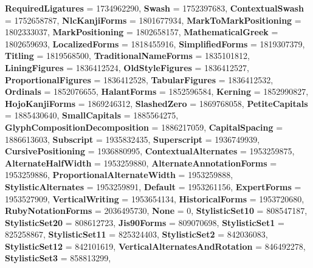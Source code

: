 \begin{DoxyCompactItemize}
{\bfseries Required\+Ligatures} = 1734962290, 
{\bfseries Swash} = 1752397683, 
{\bfseries Contextual\+Swash} = 1752658787, 
\newline
{\bfseries Nlc\+Kanji\+Forms} = 1801677934, 
{\bfseries Mark\+To\+Mark\+Positioning} = 1802333037, 
{\bfseries Mark\+Positioning} = 1802658157, 
{\bfseries Mathematical\+Greek} = 1802659693, 
\newline
{\bfseries Localized\+Forms} = 1818455916, 
{\bfseries Simplified\+Forms} = 1819307379, 
{\bfseries Titling} = 1819568500, 
{\bfseries Traditional\+Name\+Forms} = 1835101812, 
\newline
{\bfseries Lining\+Figures} = 1836412524, 
{\bfseries Old\+Style\+Figures} = 1836412527, 
{\bfseries Proportional\+Figures} = 1836412528, 
{\bfseries Tabular\+Figures} = 1836412532, 
\newline
{\bfseries Ordinals} = 1852076655, 
{\bfseries Halant\+Forms} = 1852596584, 
{\bfseries Kerning} = 1852990827, 
{\bfseries Hojo\+Kanji\+Forms} = 1869246312, 
\newline
{\bfseries Slashed\+Zero} = 1869768058, 
{\bfseries Petite\+Capitals} = 1885430640, 
{\bfseries Small\+Capitals} = 1885564275, 
{\bfseries Glyph\+Composition\+Decomposition} = 1886217059, 
\newline
{\bfseries Capital\+Spacing} = 1886613603, 
{\bfseries Subscript} = 1935832435, 
{\bfseries Superscript} = 1936749939, 
{\bfseries Cursive\+Positioning} = 1936880995, 
\newline
{\bfseries Contextual\+Alternates} = 1953259875, 
{\bfseries Alternate\+Half\+Width} = 1953259880, 
{\bfseries Alternate\+Annotation\+Forms} = 1953259886, 
{\bfseries Proportional\+Alternate\+Width} = 1953259888, 
\newline
{\bfseries Stylistic\+Alternates} = 1953259891, 
{\bfseries Default} = 1953261156, 
{\bfseries Expert\+Forms} = 1953527909, 
{\bfseries Vertical\+Writing} = 1953654134, 
\newline
{\bfseries Historical\+Forms} = 1953720680, 
{\bfseries Ruby\+Notation\+Forms} = 2036495730, 
{\bfseries None} = 0, 
{\bfseries Stylistic\+Set10} = 808547187, 
\newline
{\bfseries Stylistic\+Set20} = 808612723, 
{\bfseries Jis90\+Forms} = 809070698, 
{\bfseries Stylistic\+Set1} = 825258867, 
{\bfseries Stylistic\+Set11} = 825324403, 
\newline
{\bfseries Stylistic\+Set2} = 842036083, 
{\bfseries Stylistic\+Set12} = 842101619, 
{\bfseries Vertical\+Alternates\+And\+Rotation} = 846492278, 
{\bfseries Stylistic\+Set3} = 858813299, 

\end{DoxyCompactItemize}
